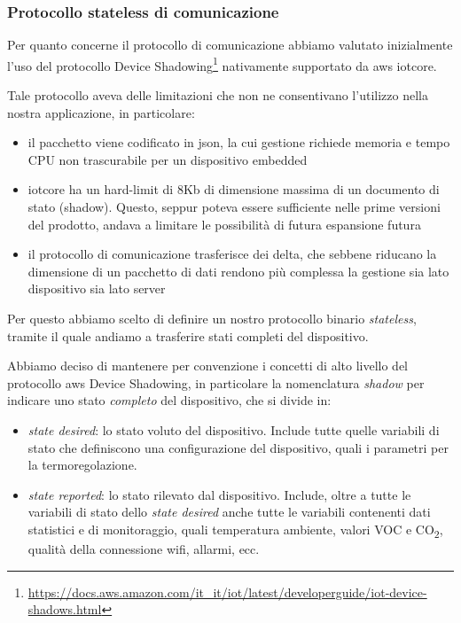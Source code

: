 \documentclass[12pt,a4paper,twoside,titlepage]{book}
\begin{document}
\subsubsection{Protocollo stateless di comunicazione}

Per quanto concerne il protocollo di comunicazione abbiamo valutato inizialmente
l'uso del protocollo Device Shadowing\footnote{\url{https://docs.aws.amazon.com/it\_it/iot/latest/developerguide/iot-device-shadows.html}}
nativamente supportato da \Gls{aws} \Gls{iotcore}.

Tale protocollo aveva delle limitazioni che non ne consentivano l'utilizzo nella nostra
applicazione, in particolare:

\begin{itemize}
    \item il pacchetto viene codificato in \acrshort{json}, la cui gestione richiede memoria
        e tempo CPU non trascurabile per un dispositivo embedded
    \item \Gls{iotcore} ha un hard-limit di 8Kb di dimensione massima di un documento di stato (shadow).
        Questo, seppur poteva essere sufficiente nelle prime versioni del prodotto, andava
        a limitare le possibilità di futura espansione futura
    \item il protocollo di comunicazione trasferisce dei delta, che sebbene riducano la
        dimensione di un pacchetto di dati rendono più complessa la gestione sia lato dispositivo 
        sia lato server
\end{itemize}

Per questo abbiamo scelto di definire un nostro protocollo binario \textit{stateless},
tramite il quale andiamo a trasferire stati completi del dispositivo.

Abbiamo deciso di mantenere per convenzione i concetti di alto livello del protocollo \Gls{aws}
Device Shadowing, in particolare la nomenclatura \textit{shadow} per indicare uno stato \textit{completo} del
dispositivo, che si divide in:
\begin{itemize}
    \item \textit{state desired}: lo stato voluto del dispositivo. Include tutte quelle variabili di stato 
        che definiscono una configurazione del dispositivo, quali i parametri per la termoregolazione.
    \item \textit{state reported}: lo stato rilevato dal dispositivo. Include, oltre a tutte le variabili 
        di stato dello \textit{state desired} anche tutte le variabili contenenti dati statistici e di monitoraggio,
        quali temperatura ambiente, valori VOC e CO\textsubscript{2}, qualità della connessione \Gls{wifi}, allarmi, ecc. 
\end{itemize}
\end{document}
